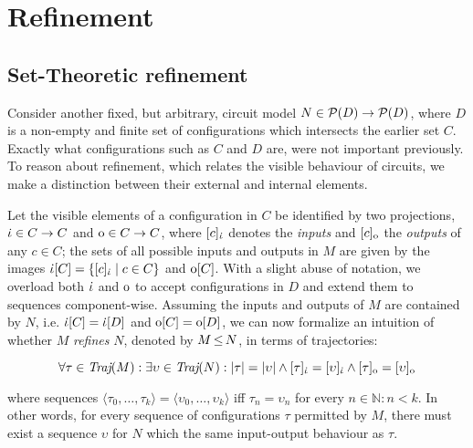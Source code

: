 \section{Refinement}

\subsection{Set-Theoretic refinement}

Consider another fixed, but arbitrary, circuit model $N \in \mathcal{P}(D) \rightarrow \mathcal{P}(D)$, where $D$ is a non-empty and finite set of configurations which intersects the earlier set $C$. Exactly what configurations such as $C$ and $D$ are, were not important previously. To reason about refinement, which relates the visible behaviour of circuits, we make a distinction between their external and internal elements.


Let the visible elements of a configuration in $C$ be identified by two projections, $\dot{\iota} \in C \rightarrow C$ and $\mathrm{o} \in C \rightarrow C$, where $[c]_{\dot{\iota}}$ denotes the \textit{inputs} and $[c]_{\mathrm{o}}$ the \textit{outputs} of any $c \in C$; the sets of all possible inputs and outputs in $M$ are given by the images $\dot{\iota}[C] = \{ [c]_{\dot{\iota}} \mid c \in C \}$ and $\mathrm{o}[C]$. With a slight abuse of notation, we overload both $\dot{\iota}$ and $\mathrm{o}$ to accept configurations in $D$ and extend them to sequences component-wise. Assuming the inputs and outputs of $M$ are contained by $N$, i.e. $\dot{\iota}[C] = \dot{\iota}[D]$ and $\mathrm{o}[C] = \mathrm{o}[D]$, we can now formalize an intuition of whether $M$ \textit{refines} $N$, denoted by $M \operatorname{\leq} N$, in terms of trajectories:


\begin{equation*}
\forall \tau \in \operatorname{\textit{Traj}}(M) : \exists \upsilon \in \operatorname{\textit{Traj}}(N) : | \tau | = | \upsilon | \wedge [\tau]_{\dot{\iota}} = [\upsilon]_{\dot{\iota}} \wedge [\tau]_{\mathrm{o}} = [\upsilon]_{\mathrm{o}}
\end{equation*}

\noindent where sequences $\langle \tau_{0}, \ldots, \tau_{k} \rangle = \langle \upsilon_{0}, \ldots, \upsilon_{k} \rangle$ iff $\tau_{n} = \upsilon_{n}$ for every $n \in \mathbb{N} : n < k$. In other words, for every sequence of configurations $\tau$ permitted by $M$, there must exist a sequence $\upsilon$ for $N$ which the same input-output behaviour as $\tau$.

